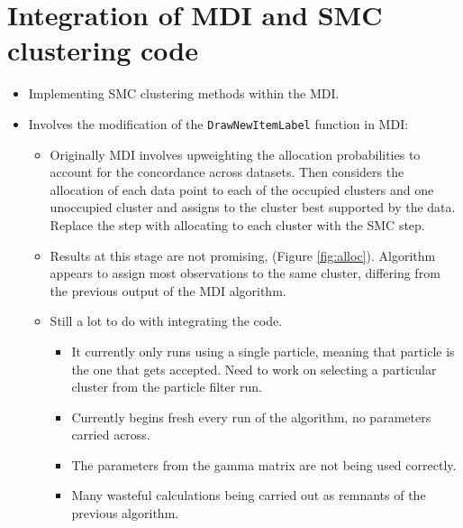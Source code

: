 \documentclass[10pt,a4paper,twoside]{article}
\begin{document}
\section{Integration of MDI and SMC clustering code}
\begin{itemize}
\item Implementing SMC clustering methods within the MDI.
\item Involves the modification of the \texttt{DrawNewItemLabel} function in MDI:
\begin{itemize}
\item Originally MDI involves upweighting the allocation probabilities to account for the concordance across datasets. Then considers the allocation of each data point to each of the occupied clusters and one unoccupied cluster and assigns to the cluster best supported by the data. Replace the step with allocating to each cluster with the SMC step.
\item Results at this stage are not promising, (Figure \ref{fig:alloc}). Algorithm appears to assign most observations to the same cluster, differing from the previous output of the MDI algorithm.
\item Still a lot to do with integrating the code. 
\begin{itemize}
\item It currently only runs using a single particle, meaning that particle is the one that gets accepted. Need to work on selecting a particular cluster from the particle filter run.
\item Currently begins fresh every run of the algorithm, no parameters carried across.
\item The parameters from the gamma matrix are not being used correctly.
\item Many wasteful calculations being carried out as remnants of the previous algorithm.
\end{itemize}
\end{itemize}
\end{itemize}
\end{document}
